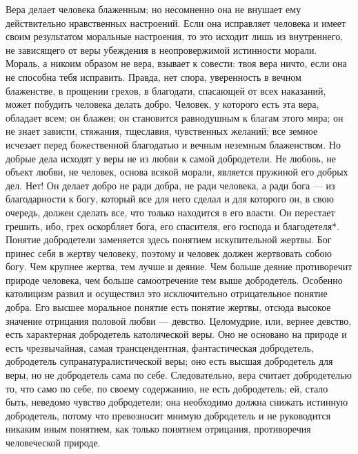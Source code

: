 \documentclass[12pt,oneside]{book}
\newcommand{\rom}[1]{\uppercase\expandafter{\romannumeral #1\relax}}
\begin{document}
Вера делает человека блаженным; но несомненно она не внушает ему действительно нравственных настроений. Если она исправляет человека и имеет своим результатом моральные настроения, то это исходит лишь из внутреннего, не зависящего от веры убеждения в неопровержимой истинности морали. Мораль, а никоим образом не вера, взывает к совести: твоя вера ничто, если она не способна тебя исправить. Правда, нет спора, уверенность в вечном блаженстве, в прощении грехов, в благодати, спасающей от всех наказаний, может побудить человека делать добро. Человек, у которого есть эта вера, обладает всем; он блажен\ddag\let\svthefootnote\thefootnote\let\thefootnote\relax\footnotetext{\ddagсм. об этом у Лютера, например, ч. \rom{14}, стр. 286.}\let\thefootnote\svthefootnote; он становится равнодушным к благам этого мира; он не знает зависти, стяжания, тщеславия, чувственных желаний; все земное исчезает перед божественной благодатью и вечным неземным блаженством. Но добрые дела исходят у веры не из любви к самой добродетели. Не любовь, не объект любви, не человек, основа всякой морали, является пружиной его добрых дел. Нет! Он делает добро не ради добра, не ради человека, а ради бога --- из благодарности к богу, который все для него сделал и для которого он, в свою очередь, должен сделать все, что только находится в его власти. Он перестает грешить, ибо, грех оскорбляет бога, его спасителя, его господа и благодетеля*\let\svthefootnote\thefootnote\let\thefootnote\relax{}\let\thefootnote\svthefootnote. Понятие добродетели заменяется здесь понятием искупительной жертвы. Бог принес себя в жертву человеку, поэтому и человек должен жертвовать собою богу. Чем крупнее жертва, тем лучше и деяние. Чем больше деяние противоречит природе человека, чем больше самоотречение тем выше добродетель. Особенно католицизм развил и осуществил это исключительно отрицательное понятие добра. Его высшее моральное понятие есть понятие жертвы, отсюда высокое значение отрицания половой любви --- девство. Целомудрие, или, вернее девство, есть характерная добродетель католической веры. Оно не основано на природе и есть чрезвычайная, самая трансцендентная, фантастическая добродетель, добродетель супранатуралистической веры; оно есть высшая добродетель для веры, но не добродетель сама по себе. Следовательно, вера считает добродетелью то, что само по себе, по своему содержанию, не есть добродетель; ей, стало быть, неведомо чувство добродетели; она необходимо должна снижать истинную добродетель, потому что превозносит мнимую добродетель и не руководится никаким иным понятием, как только понятием отрицания, противоречия человеческой природе.
\end{document}
